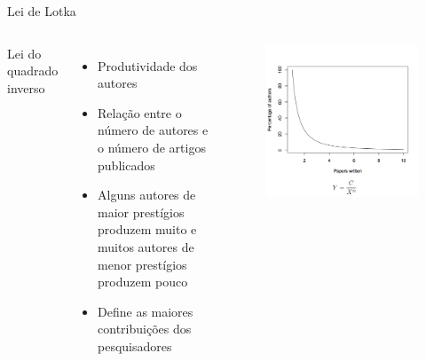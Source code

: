 \begin{frame}{Lei de Lotka}

	\begin{columns}
		Lei do quadrado inverso
		\begin{itemize}
			\item Produtividade dos autores	
			\item Relação entre o número de autores e o número de artigos publicados
			\item Alguns autores de maior prestígios produzem muito e muitos autores de menor prestígios produzem pouco
			\item Define as maiores contribuições dos pesquisadores
		\end{itemize}
		\begin{figure}[hb]
			\includegraphics[width=1\textwidth]{figures/lokta.png}
		\end{figure}
	\end{columns}

\end{frame}

